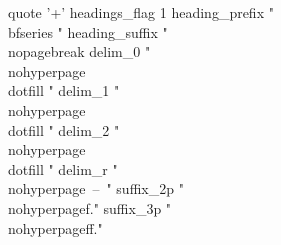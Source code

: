 quote '+' %
headings_flag 1
heading_prefix "{\\bfseries "
heading_suffix "}\\nopagebreak%
delim_0 "\\nohyperpage{\\dotfill }"
delim_1 "\\nohyperpage{\\dotfill }"
delim_2 "\\nohyperpage{\\dotfill }"
delim_r "\\nohyperpage{~--~}"
suffix_2p "\\nohyperpage{f.}"
suffix_3p "\\nohyperpage{ff.}"
